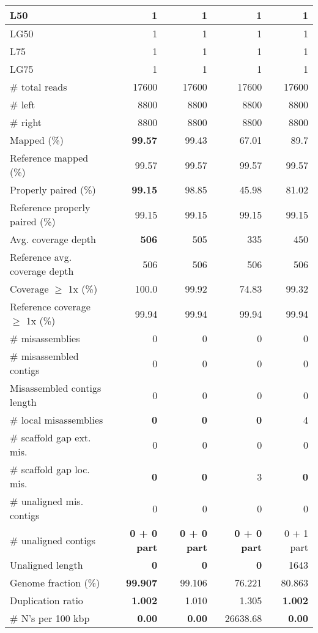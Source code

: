 \documentclass[12pt,a4paper]{article}
\begin{document}
\begin{table}[ht]
\begin{center}
\begin{tabular}{|l*{4}{|r}|}
L50 & 1 & 1 & 1 & 1 \\ \hline
LG50 & 1 & 1 & 1 & 1 \\ \hline
L75 & 1 & 1 & 1 & 1 \\ \hline
LG75 & 1 & 1 & 1 & 1 \\ \hline
\# total reads & 17600 & 17600 & 17600 & 17600 \\ \hline
\# left & 8800 & 8800 & 8800 & 8800 \\ \hline
\# right & 8800 & 8800 & 8800 & 8800 \\ \hline
Mapped (\%) & {\bf 99.57} & 99.43 & 67.01 & 89.7 \\ \hline
Reference mapped (\%) & 99.57 & 99.57 & 99.57 & 99.57 \\ \hline
Properly paired (\%) & {\bf 99.15} & 98.85 & 45.98 & 81.02 \\ \hline
Reference properly paired (\%) & 99.15 & 99.15 & 99.15 & 99.15 \\ \hline
Avg. coverage depth & {\bf 506} & 505 & 335 & 450 \\ \hline
Reference avg. coverage depth & 506 & 506 & 506 & 506 \\ \hline
Coverage $\geq$ 1x (\%) & 100.0 & 99.92 & 74.83 & 99.32 \\ \hline
Reference coverage $\geq$ 1x (\%) & 99.94 & 99.94 & 99.94 & 99.94 \\ \hline
\# misassemblies & 0 & 0 & 0 & 0 \\ \hline
\# misassembled contigs & 0 & 0 & 0 & 0 \\ \hline
Misassembled contigs length & 0 & 0 & 0 & 0 \\ \hline
\# local misassemblies & {\bf 0} & {\bf 0} & {\bf 0} & 4 \\ \hline
\# scaffold gap ext. mis. & 0 & 0 & 0 & 0 \\ \hline
\# scaffold gap loc. mis. & {\bf 0} & {\bf 0} & 3 & {\bf 0} \\ \hline
\# unaligned mis. contigs & 0 & 0 & 0 & 0 \\ \hline
\# unaligned contigs & {\bf 0 + 0 part} & {\bf 0 + 0 part} & {\bf 0 + 0 part} & 0 + 1 part \\ \hline
Unaligned length & {\bf 0} & {\bf 0} & {\bf 0} & 1643 \\ \hline
Genome fraction (\%) & {\bf 99.907} & 99.106 & 76.221 & 80.863 \\ \hline
Duplication ratio & {\bf 1.002} & 1.010 & 1.305 & {\bf 1.002} \\ \hline
\# N's per 100 kbp & {\bf 0.00} & {\bf 0.00} & 26638.68 & {\bf 0.00} \\ \hline

\end{tabular}
\end{center}
\end{table}
\end{document}
